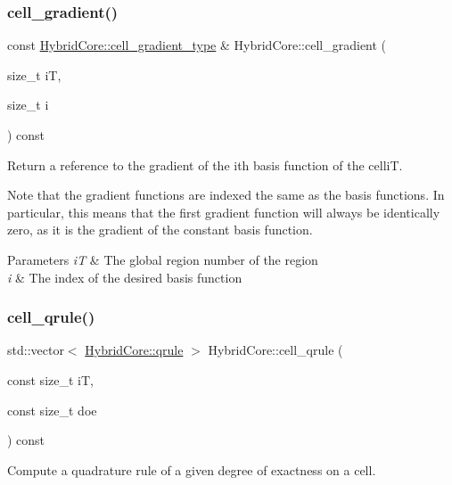 \subsubsection{\texorpdfstring{cell\+\_\+gradient()}{cell\_gradient()}}
{\footnotesize\ttfamily const \hyperlink{classHArDCore2D_1_1HybridCore_a41350d7c3ac5a5a5e932348d2c9d0750}{Hybrid\+Core\+::cell\+\_\+gradient\+\_\+type} \& Hybrid\+Core\+::cell\+\_\+gradient (\begin{DoxyParamCaption}\item[{size\+\_\+t}]{iT,  }\item[{size\+\_\+t}]{i }\end{DoxyParamCaption}) const}



Return a reference to the gradient of the i\textquotesingle{}th basis function of the celliT. 

Note that the gradient functions are indexed the same as the basis functions. In particular, this means that the first gradient function will always be identically zero, as it is the gradient of the constant basis function. 
\begin{DoxyParams}{Parameters}
{\em iT} & The global region number of the region \\
\hline
{\em i} & The index of the desired basis function \\
\hline
\end{DoxyParams}
\mbox{\label{classHArDCore2D_1_1HybridCore_a9ecd6ca61d4f9e3f3e3af81d8de394d0}} 
\subsubsection{\texorpdfstring{cell\+\_\+qrule()}{cell\_qrule()}}
{\footnotesize\ttfamily std\+::vector$<$ \hyperlink{structHArDCore2D_1_1HybridCore_1_1qrule}{Hybrid\+Core\+::qrule} $>$ Hybrid\+Core\+::cell\+\_\+qrule (\begin{DoxyParamCaption}\item[{const size\+\_\+t}]{iT,  }\item[{const size\+\_\+t}]{doe }\end{DoxyParamCaption}) const}



Compute a quadrature rule of a given degree of exactness on a cell. 

